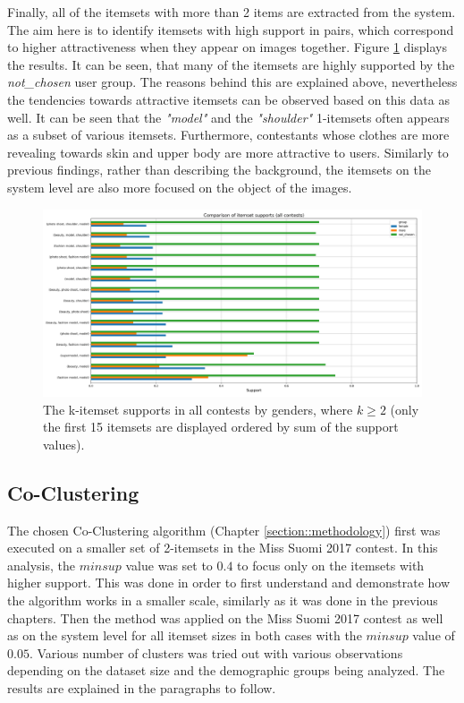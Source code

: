 Finally, all of the itemsets with more than 2 items are extracted from the system. The aim here is to identify itemsets with high support in pairs, which correspond to higher attractiveness when they appear on images together. Figure \ref{itemset_supports-gender-all_contests-over2_itemset} displays the results. It can be seen, that many of the itemsets are highly supported by the \emph{not\_chosen} user group. The reasons behind this are explained above, nevertheless the tendencies towards attractive itemsets can be observed based on this data as well. It can be seen that the \emph{"{model}"} and the \emph{"{shoulder}"} 1-itemsets often appears as a subset of various itemsets. Furthermore, contestants whose clothes are more revealing towards skin and upper body are more attractive to users. Similarly to previous findings, rather than describing the background, the itemsets on the system level are also more focused on the object of the images. 

\begin{figure}[h] 
    \begin{center}
        \includegraphics[width=1.0\textwidth]{Images/itemset_supports-gender-all_contests-over2_itemset.png}
        \caption{The k-itemset supports in all contests by genders, where $k \geq 2$ (only the first 15 itemsets are displayed ordered by sum of the support values).}
        \label{itemset_supports-gender-all_contests-over2_itemset}
    \end{center}
\end{figure}

\subsection{Co-Clustering}
The chosen Co-Clustering algorithm (Chapter \ref{section::methodology}) first was executed on a smaller set of 2-itemsets in the Miss Suomi 2017 contest. In this analysis, the $minsup$ value was set to $0.4$ to focus only on the itemsets with higher support. This was done in order to first understand and demonstrate how the algorithm works in a smaller scale, similarly as it was done in the previous chapters. Then the method was applied on the Miss Suomi 2017 contest as well as on the system level for all itemset sizes in both cases with the $minsup$ value of $0.05$. Various number of clusters was tried out with various observations depending on the dataset size and the demographic groups being analyzed. The results are explained in the paragraphs to follow. 

